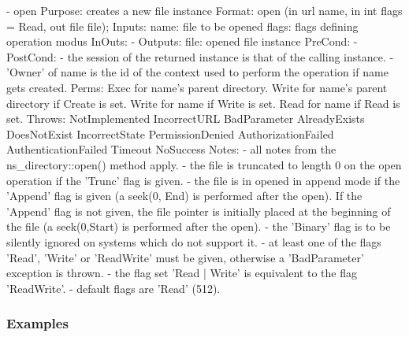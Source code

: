 \begin{myspec}
 
    - open
      Purpose:  creates a new file instance
      Format:   open               (in  url       name,
                                    in  int       flags = Read,
                                    out file      file);
      Inputs:   name:               file to be opened
                flags:              flags defining operation
                                    modus
      InOuts:   -
      Outputs:  file:               opened file instance
      PreCond:  -
      PostCond: - the session of the returned instance is that of
                  the calling instance.
                - 'Owner' of name is the id of the context
                  used to perform the operation if name gets
                  created.
      Perms:    Exec  for name's parent directory.
                Write for name's parent directory if Create is set.
                Write for name if Write is set.
                Read  for name if Read  is set.
      Throws:   NotImplemented
                IncorrectURL
                BadParameter
                AlreadyExists
                DoesNotExist
                IncorrectState
                PermissionDenied
                AuthorizationFailed
                AuthenticationFailed
                Timeout
                NoSuccess
      Notes:    - all notes from the ns_directory::open() method
                  apply.
                - the file is truncated to length 0 on the open
                  operation if the 'Trunc' flag is given.
                - the file is in opened in append mode if the
                  'Append' flag is given (a seek(0, End) is
                  performed after the open).  If the 'Append'
                  flag is not given, the file pointer is
                  initially placed at the beginning of the file 
                  (a seek(0,Start) is performed after the open).
                - the 'Binary' flag is to be silently ignored on
                  systems which do not support it.
                - at least one of the flags 'Read', 'Write' or
                  'ReadWrite' must be given, otherwise a
                  'BadParameter' exception is thrown.
                - the flag set 'Read | Write' is equivalent to
                  the flag 'ReadWrite'.
                - default flags are 'Read' (512).
 \end{myspec}
 
 
 \subsubsection{Examples}
 
